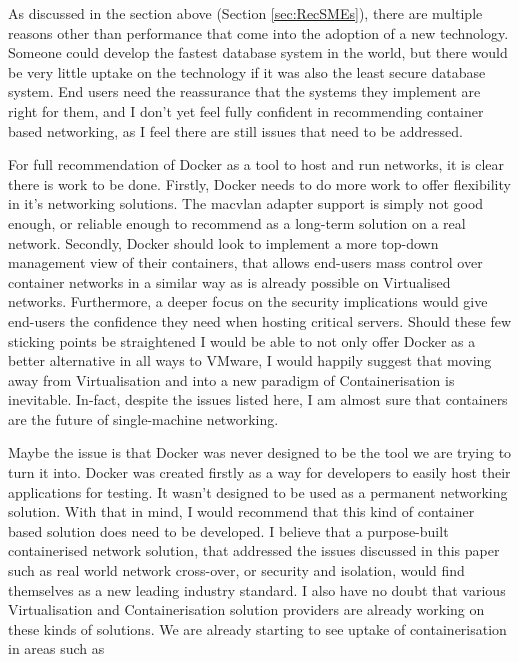 As discussed in the section above (Section \ref{sec:RecSMEs}), there are multiple reasons other than performance that come into the adoption of a new technology. Someone could develop the fastest database system in the world, but there would be very little uptake on the technology if it was also the least secure database system. End users need the reassurance that the systems they implement are right for them, and I don't yet feel fully confident in recommending container based networking, as I feel there are still issues that need to be addressed.

For full recommendation of Docker as a tool to host and run networks, it is clear there is work to be done. Firstly, Docker needs to do more work to offer flexibility in it's networking solutions. The macvlan adapter support is simply not good enough, or reliable enough to recommend as a long-term solution on a real network. Secondly, Docker should look to implement a more top-down management view of their containers, that allows end-users mass control over container networks in a similar way as is already possible on Virtualised networks. Furthermore, a deeper focus on the security implications would give end-users the confidence they need when hosting critical servers. Should these few sticking points be straightened I would be able to not only offer Docker as a better alternative in all ways to VMware, I would happily suggest that moving away from Virtualisation and into a new paradigm of Containerisation is inevitable. In-fact, despite the issues listed here, I am almost sure that containers are the future of single-machine networking.

Maybe the issue is that Docker was never designed to be the tool we are trying to turn it into. Docker was created firstly as a way for developers to easily host their applications for testing. It wasn't designed to be used as a permanent networking solution. With that in mind, I would recommend that this kind of container based solution does need to be developed. I believe that a purpose-built containerised network solution, that addressed the issues discussed in this paper such as real world network cross-over, or security and isolation, would find themselves as a new leading industry standard. I also have no doubt that various Virtualisation and Containerisation solution providers are already working on these kinds of solutions. We are already starting to see uptake of containerisation in areas such as %
